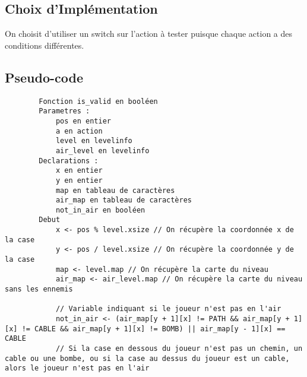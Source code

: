 \subsection{Choix d'Implémentation}

On choisit d'utiliser un switch sur l'action à tester puisque chaque action a des conditions différentes.

\subsection{Pseudo-code}

\begin{longlisting}
    \begin{verbatim}
        Fonction is_valid en booléen
        Parametres :
            pos en entier
            a en action
            level en levelinfo
            air_level en levelinfo
        Declarations :
            x en entier
            y en entier
            map en tableau de caractères
            air_map en tableau de caractères
            not_in_air en booléen
        Debut
            x <- pos % level.xsize // On récupère la coordonnée x de la case
            y <- pos / level.xsize // On récupère la coordonnée y de la case
            map <- level.map // On récupère la carte du niveau
            air_map <- air_level.map // On récupère la carte du niveau sans les ennemis

            // Variable indiquant si le joueur n'est pas en l'air
            not_in_air <- (air_map[y + 1][x] != PATH && air_map[y + 1][x] != CABLE && air_map[y + 1][x] != BOMB) || air_map[y - 1][x] == CABLE
            // Si la case en dessous du joueur n'est pas un chemin, un cable ou une bombe, ou si la case au dessus du joueur est un cable, alors le joueur n'est pas en l'air


\end{verbatim}
\end{longlisting}
